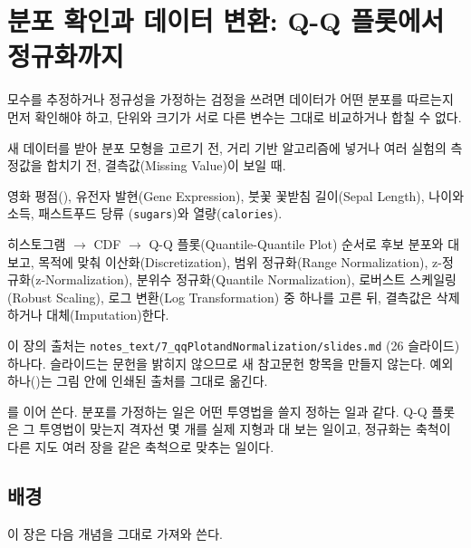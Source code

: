 \chapter{분포 확인과 데이터 변환: Q-Q 플롯에서 정규화까지}
\label{ch:qq-normalization}

\begin{inbrief}
  \item[Why] 모수를 추정하거나 정규성을 가정하는 검정을 쓰려면 데이터가 어떤
             분포를 따르는지 먼저 확인해야 하고, 단위와 크기가 서로 다른
             변수는 그대로 비교하거나 합칠 수 없다.
  \item[When] 새 데이터를 받아 분포 모형을 고르기 전, 거리 기반 알고리즘에
              넣거나 여러 실험의 측정값을 합치기 전, 결측값(Missing
              Value)이 보일 때.
  \item[Where] 영화 평점(), 유전자 발현(Gene Expression), 붓꽃
               꽃받침 길이(Sepal Length), 나이와 소득, 패스트푸드 당류
               (\texttt{sugars})와 열량(\texttt{calories}).
  \item[How] 히스토그램 $\to$ CDF $\to$ Q-Q 플롯(Quantile-Quantile Plot)
             순서로 후보 분포와 대 보고, 목적에 맞춰 이산화(Discretization),
             범위 정규화(Range Normalization), z-정규화(z-Normalization),
             분위수 정규화(Quantile Normalization), 로버스트 스케일링
             (Robust Scaling), 로그 변환(Log Transformation) 중 하나를 고른
             뒤, 결측값은 삭제하거나 대체(Imputation)한다.
\end{inbrief}

이 장의 출처는 \texttt{notes\_text/7\_qqPlotandNormalization/slides.md}
(26 슬라이드) 하나다. 슬라이드는 문헌을 밝히지 않으므로 새 참고문헌 항목을
만들지 않는다. 예외 하나()는 그림 안에 인쇄된 출처를
그대로 옮긴다.

를 이어 쓴다. 분포를 가정하는 일은 어떤 투영법을 쓸지
정하는 일과 같다. Q-Q 플롯은 그 투영법이 맞는지 격자선 몇 개를 실제 지형과
대 보는 일이고, 정규화는 축척이 다른 지도 여러 장을 같은 축척으로 맞추는
일이다.

\section{배경}
\label{sec:qq-background}

이 장은 다음 개념을 그대로 가져와 쓴다.

